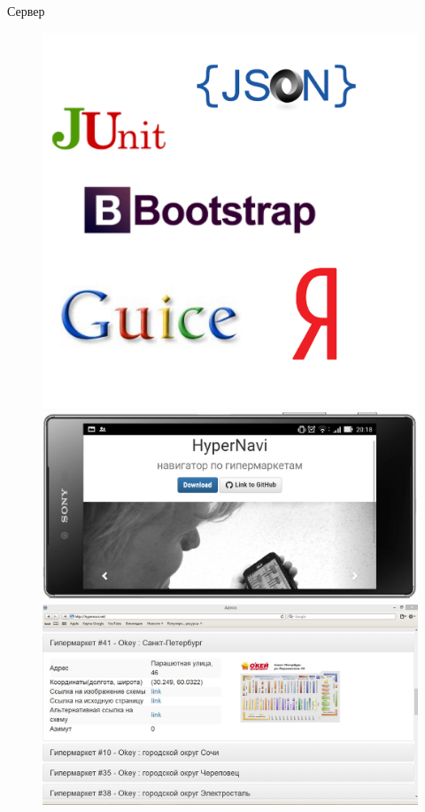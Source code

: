 \documentclass[11pt,slides,aspectratio=43]{beamer}%
\begin{document}
    \begin{frame}{Сервер}

        \begin{figure}[t!]
              \center\includegraphics[width = \linewidth]{logosServer.png} %
            \endminipage\hfill
              \center\includegraphics[width = \linewidth]{site.png}
              \center\includegraphics[width = \linewidth]{admin.jpg}
            \endminipage\hfill
        \end{figure}
    \end{frame}
\end{document}
